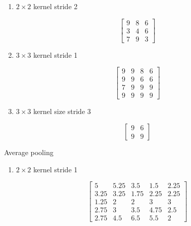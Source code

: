 \documentclass[12pt,a4paper]{article}
\begin{document}
\begin{enumerate}
\begin{enumerate}
\begin{enumerate}
                          \item $2\times 2$ kernel stride 2

                                \[
                                \begin{bmatrix}
                                  9 & 8 & 6 \\
                                  3 & 4 & 6 \\
                                  7 & 9 & 3
                                \end{bmatrix}
                                \]


                          \item $3 \times 3 $ kernel stride 1

                                \[
                                \begin{bmatrix}
                                  9 & 9 & 8 & 6 \\
                                  9 & 9 & 6 & 6 \\
                                  7 & 9 & 9 & 9 \\
                                  9 & 9 & 9 & 9
                                \end{bmatrix}
                                \]


                          \item $3 \times 3$ kernel size stride 3

                                \[
                                \begin{bmatrix}
                                  9 & 6 \\
                                  9 & 9
                                \end{bmatrix}
                                \]
                        \end{enumerate}


                                Average pooling

                        \begin{enumerate}
                          \item $2\times 2$ kernel stride 1

                                \[
                                \begin{bmatrix}
                                  5 & 5.25 & 3.5 & 1.5 & 2.25  \\
                                  3.25 & 3.25 & 1.75 & 2.25 & 2.25 \\
                                  1.25 & 2 & 2 & 3 & 3 \\
                                  2.75 & 3 & 3.5 & 4.75 & 2.5 \\
                                  2.75 & 4.5 & 6.5 & 5.5 & 2
                                \end{bmatrix}
                                \]



\end{enumerate}
\end{enumerate}
\end{enumerate}
\end{document}

